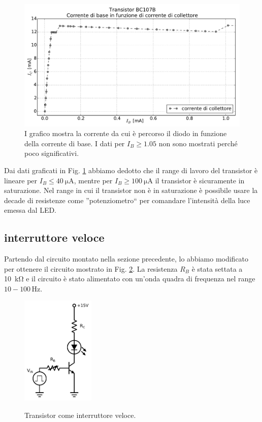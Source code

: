 
\begin{figure}
	\includegraphics[width=120mm]{saturazione_2.pdf}
	\caption{I grafico mostra la corrente da cui è percorso il diodo in funzione della corrente di base. I dati per $I_B \geq 1.05$ non sono mostrati perché poco significativi.}
	\label{fig:saturazione}
\end{figure}

Dai dati graficati in Fig. \ref{fig:saturazione} abbiamo dedotto che il range di lavoro del transistor è lineare per $I_B \leq \SI{40}{\micro\ampere}$, mentre per $I_B \geq \SI{100}{\micro\ampere}$ il transistor è sicuramente in saturazione. Nel range in cui il transistor non è in saturazione è possibile usare la decade di resistenze come ''potenziometro`` per comandare l'intensità della luce emessa dal LED.

\subsection{interruttore veloce}
Partendo dal circuito montato nella sezione precedente, lo abbiamo modificato per ottenere il circuito mostrato in Fig. \ref{fig:cc2}. La resistenza $R_B$ è stata settata a \SI{10}{\kilo\ohm} e il circuito è stato alimentato con un'onda quadra di frequenza nel range $10-100\,\si{\hertz}$.

\begin{figure}
	\caption{Transistor come interruttore veloce.}
	\includegraphics[width=35mm]{cc2.pdf}
	\label{fig:cc2}
\end{figure}

